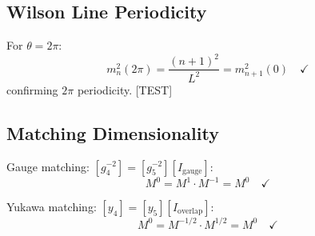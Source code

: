\documentclass[11pt,a4paper]{article}
\begin{document}
\subsection{Wilson Line Periodicity}

For $\theta = 2\pi$:
\begin{equation}
m_n^2(2\pi) = \frac{(n+1)^2}{L^2} = m_{n+1}^2(0) \quad \checkmark
\label{eq:wilson-period-check}
\end{equation}
confirming $2\pi$ periodicity. [TEST]

\subsection{Matching Dimensionality}

Gauge matching: $[g_4^{-2}] = [g_5^{-2}][I_{\text{gauge}}]$:
\begin{equation}
M^0 = M^1 \cdot M^{-1} = M^0 \quad \checkmark
\label{eq:gauge-dim-check}
\end{equation}

Yukawa matching: $[y_4] = [y_5][I_{\text{overlap}}]$:
\begin{equation}
M^0 = M^{-1/2} \cdot M^{1/2} = M^0 \quad \checkmark
\label{eq:yukawa-dim-check}
\end{equation}
\end{document}
